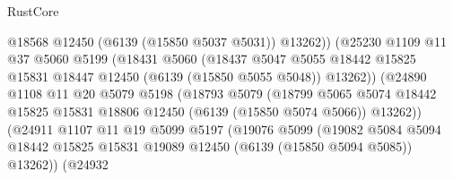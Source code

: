 \begin{lexlean}{RustCore}
\begin{coremodule}
                                  @18568
                                  @12450
                                  (@6139 (@15850 @5037 @5031))
                                  @13262))
                              (@25230
                                @1109
                                @11
                                @37
                                @5060
                                @5199
                                (@18431
                                  @5060
                                  (@18437
                                    @5047
                                    @5055
                                    @18442
                                    @15825
                                    @15831
                                    @18447
                                    @12450
                                    (@6139 (@15850 @5055 @5048))
                                    @13262))
                                (@24890
                                  @1108
                                  @11
                                  @20
                                  @5079
                                  @5198
                                  (@18793
                                    @5079
                                    (@18799
                                      @5065
                                      @5074
                                      @18442
                                      @15825
                                      @15831
                                      @18806
                                      @12450
                                      (@6139 (@15850 @5074 @5066))
                                      @13262))
                                  (@24911
                                    @1107
                                    @11
                                    @19
                                    @5099
                                    @5197
                                    (@19076
                                      @5099
                                      (@19082
                                        @5084
                                        @5094
                                        @18442
                                        @15825
                                        @15831
                                        @19089
                                        @12450
                                        (@6139 (@15850 @5094 @5085))
                                        @13262))
                                    (@24932

\end{coremodule}
\end{lexlean}
